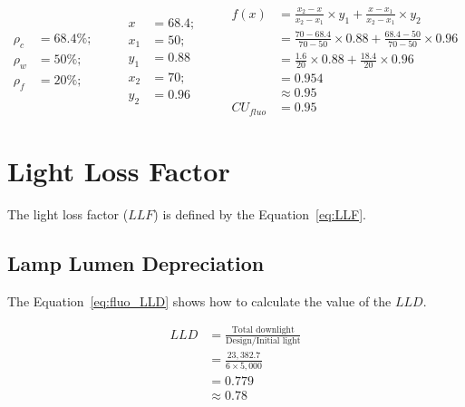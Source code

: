 \begin{equation}
\begin{split}
\rho_c &= 68.4\%; \\
\rho_w &= 50\%; \\
\rho_f &= 20\%;
\end{split}
\qquad
\begin{split}
x &= 68.4; \\
x_1 &= 50; \\ y_1 &= 0.88 \\
x_2 &= 70; \\ y_2 &= 0.96
\end{split}
\qquad
\begin{split}
f(x) &= \frac{x_2 - x}{x_2 - x_1} \times y_1 +
       \frac{x - x_1}{x_2 - x_1} \times y_2 \\
 &= \frac{70 - 68.4}{70 - 50} \times 0.88 +
    \frac{68.4 - 50}{70 - 50} \times 0.96 \\
 &= \frac{1.6}{20} \times 0.88 +
    \frac{18.4}{20} \times 0.96 \\
 & = 0.954 \\
 & \approx 0.95 \\
CU_{fluo} & = 0.95
\end{split}
\label{eq:fluo_cu}
\end{equation}

\section{Light Loss Factor}
The light loss factor ($LLF$) is defined by the Equation~\ref{eq:LLF}.

\subsection{Lamp Lumen Depreciation}
The Equation~\ref{eq:fluo_LLD} shows how to calculate the value of the $LLD$.

\begin{equation}
\begin{split}
LLD & = \frac{\text{Total downlight}}{\text{Design/Initial light}} \\
 & = \frac{23,382.7}{6 \times 5,000} \\
 & =  0.779 \\
 & \approx 0.78
\end{split}
\label{eq:fluo_LLD}
\end{equation}

